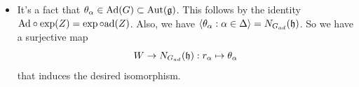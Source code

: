 \begin{itemize}
    reflection $s_\alpha$ can be extended to an automorphism of $\fr{g}$.
    \begin{dang}
        \begin{remark}
            If $\delta\in\text{Der}(\fr{g})$ is a nilpotent derivation, then $\exp(\delta)\in\Aut(\fr{g})$.
        \end{remark}
    \end{dang}
    \item It's a fact that $\theta_\alpha \in \text{Ad}(G)\subset\text{Aut}(\mathfrak{g})$. This follows by the identity 
    $\text{Ad}\circ\exp(Z)=\exp\circ\text{ad}(Z)$. Also, we have  
    $\langle \theta_\alpha:\alpha\in\Delta \rangle=N_{G_{ad}}(\mathfrak{h})$. So we have a surjective map 
    \begin{equation}
        W\to N_{G_{ad}}(\mathfrak{h}): r_\alpha\mapsto \theta_\alpha
    \end{equation}
    that induces the desired isomorphism.
\end{itemize}

